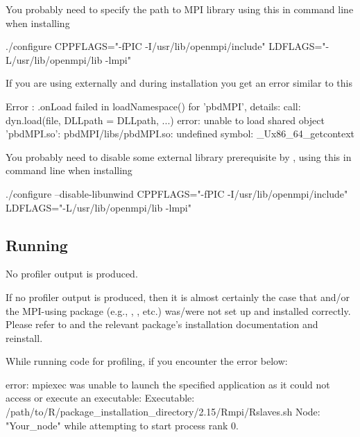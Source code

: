 \begin{solution}
You probably need to specify the path to MPI library
using this in command line when installing 
\begin{Output}
./configure CPPFLAGS="-fPIC -I/usr/lib/openmpi/include" LDFLAGS="-L/usr/lib/openmpi/lib -lmpi"
\end{Output}  
\end{solution}


\begin{problem}
If you are using  externally
and during 
installation you get an error similar to this
\begin{Output}
Error : .onLoad failed in loadNamespace() for 'pbdMPI', details:
  call: dyn.load(file, DLLpath = DLLpath, ...)
  error: unable to load shared object 'pbdMPI.so':
  pbdMPI/libs/pbdMPI.so: undefined symbol: _Ux86_64_getcontext
\end{Output}
\end{problem}
  
\begin{solution}
You probably need to disable some external library
prerequisite by ,
using this in command line when installing 
\begin{Code}
./configure --disable-libunwind CPPFLAGS="-fPIC -I/usr/lib/openmpi/include" LDFLAGS="-L/usr/lib/openmpi/lib -lmpi"
\end{Code}  
\end{solution}


\subsection{Running}

\begin{problem}
No profiler output is produced.
\end{problem}

\begin{solution}
If no profiler output is produced, then it is almost certainly the case that 
 and/or the MPI-using  package (e.g., , 
, etc.) was/were not set up and installed correctly.  Please refer to 
 and the relevant package's installation 
documentation and reinstall.
\end{solution}



\begin{problem}
While running  code for profiling, if you
encounter the error below:
\begin{Output}
error: mpiexec was unable to launch the specified application as it could not access
or execute an executable:
Executable: /path/to/R/package_installation_directory/2.15/Rmpi/Rslaves.sh
Node: "Your_node"
while attempting to start process rank 0.
\end{Output} 
\end{problem}

